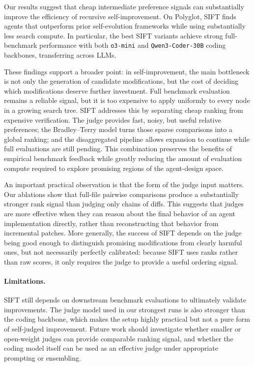 \documentclass{article}
\begin{document}
Our results suggest that cheap intermediate preference signals can substantially improve the efficiency of recursive self-improvement. On Polyglot, SIFT finds agents that outperform prior self-evolution frameworks while using substantially less search compute. In particular, the best SIFT variants achieve strong full-benchmark performance with both \texttt{o3-mini} and \texttt{Qwen3-Coder-30B} coding backbones, transferring across LLMs. 

These findings support a broader point: in self-improvement, the main bottleneck is not only the generation of candidate modifications, but the cost of deciding which modifications deserve further investment. Full benchmark evaluation remains a reliable signal, but it is too expensive to apply uniformly to every node in a growing search tree. SIFT addresses this by separating cheap ranking from expensive verification. The judge provides fast, noisy, but useful relative preferences; the Bradley--Terry model turns those sparse comparisons into a global ranking; and the disaggregated pipeline allows expansion to continue while full evaluations are still pending. This combination preserves the benefits of empirical benchmark feedback while greatly reducing the amount of evaluation compute required to explore promising regions of the agent-design space.

An important practical observation is that the form of the judge input matters. Our ablations show that full-file pairwise comparisons produce a substantially stronger rank signal than judging only chains of diffs. This suggests that judges are more effective when they can reason about the final behavior of an agent implementation directly, rather than reconstructing that behavior from incremental patches. More generally, the success of SIFT depends on the judge being good enough to distinguish promising modifications from clearly harmful ones, but not necessarily perfectly calibrated: because SIFT uses ranks rather than raw scores, it only requires the judge to provide a useful ordering signal.

\paragraph{Limitations.}
SIFT still depends on downstream benchmark evaluations to ultimately validate improvements. The judge model used in our strongest runs is also stronger than the coding backbone, which makes the setup highly practical but not a pure form of self-judged improvement. Future work should investigate whether smaller or open-weight judges can provide comparable ranking signal, and whether the coding model itself can be used as an effective judge under appropriate prompting or ensembling.
\end{document}
